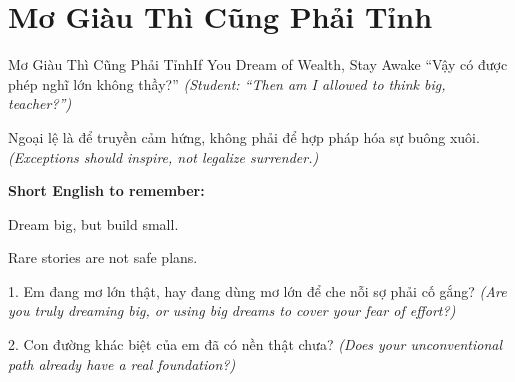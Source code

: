 \section{Mơ Giàu Thì Cũng Phải Tỉnh}
\begin{truyen}{Mơ Giàu Thì Cũng Phải Tỉnh}{If You Dream of Wealth, Stay Awake}
 ``Vậy có được phép nghĩ lớn không thầy?''
\textit{(Student: ``Then am I allowed to think big, teacher?'')}

\end{truyen}

\begin{baihoc}
Ngoại lệ là để truyền cảm hứng, không phải để hợp pháp hóa sự buông xuôi.
\textit{(Exceptions should inspire, not legalize surrender.)}
\end{baihoc}

\begin{ghinhoanh}
\textbf{Short English to remember:}

Dream big, but build small.

Rare stories are not safe plans.
\end{ghinhoanh}

\begin{tuhocnhanh}
1. Em đang mơ lớn thật, hay đang dùng mơ lớn để che nỗi sợ phải cố gắng? \textit{(Are you truly dreaming big, or using big dreams to cover your fear of effort?)}

2. Con đường khác biệt của em đã có nền thật chưa? \textit{(Does your unconventional path already have a real foundation?)}
\end{tuhocnhanh}

\ngancach
